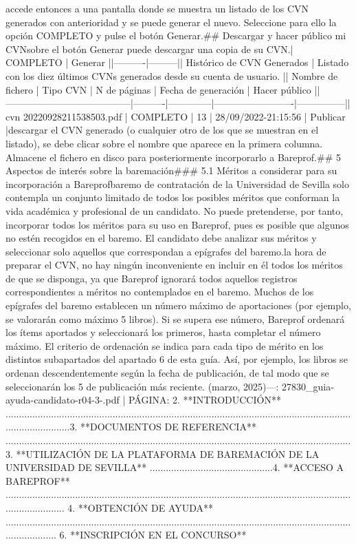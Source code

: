 \documentclass{article}
\begin{document}
\begin{itemize}
{{accede entonces a una pantalla donde se muestra un listado de los CVN generados con anterioridad y se puede generar el nuevo. Seleccione para ello la opción COMPLETO y pulse el botón Generar.\n\n## Descargar y hacer público mi CVN\n\nPulsando sobre el botón Generar puede descargar una copia de su CVN.\n\n| COMPLETO | Generar |\n|----------|---------|\n| Histórico de CVN Generados | Listado con los diez últimos CVNs generados desde su cuenta de usuario. |\n\n| Nombre de fichero                     | Tipo CVN | N de páginas | Fecha de generación     | Hacer público |\n|---------------------------------------|----------|--------------|-------------------------|---------------|\n| cvn 20220928211538503.pdf             | COMPLETO | 13           | 28/09/2022-21:15:56     | Publicar      |\n\nPara descargar el CVN generado (o cualquier otro de los que se muestran en el listado), se debe clicar sobre el nombre que aparece en la primera columna. Almacene el fichero en disco para posteriormente incorporarlo a Bareprof.\n\n## 5 Aspectos de interés sobre la baremación\n\n### 5.1 Méritos a considerar para su incorporación a Bareprof\n\nEl baremo de contratación de la Universidad de Sevilla solo contempla un conjunto limitado de todos los posibles méritos que conforman la vida académica y profesional de un candidato. No puede pretenderse, por tanto, incorporar todos los méritos para su uso en Bareprof, pues es posible que algunos no estén recogidos en el baremo. El candidato debe analizar sus méritos y seleccionar solo aquellos que correspondan a epígrafes del baremo.\n\nA la hora de preparar el CVN, no hay ningún inconveniente en incluir en él todos los méritos de que se disponga, ya que Bareprof ignorará todos aquellos registros correspondientes a méritos no contemplados en el baremo. Muchos de los epígrafes del baremo establecen un número máximo de aportaciones (por ejemplo, se valorarán como máximo 5 libros). Si se supera ese número, Bareprof ordenará los ítems aportados y seleccionará los primeros, hasta completar el número máximo. El criterio de ordenación se indica para cada tipo de mérito en los distintos subapartados del apartado 6 de esta guía. Así, por ejemplo, los libros se ordenan descendentemente según la fecha de publicación, de tal modo que se seleccionarán los 5 de publicación más reciente.\n{} (marzo, 2025)\n\n---\n\nFUENTE: 27830_guia-ayuda-candidato-r04-3-.pdf | PÁGINA: 2. **INTRODUCCIÓN** .........................................................................................................................................................3. **DOCUMENTOS DE REFERENCIA** .................................................................................................................................3. **UTILIZACIÓN DE LA PLATAFORMA DE BAREMACIÓN DE LA UNIVERSIDAD DE SEVILLA** ..............................................4. **ACCESO A BAREPROF** ....................................................................................................................................................... 4. **OBTENCIÓN DE AYUDA** .................................................................................................................................................... 6. **INSCRIPCIÓN EN EL CONCURSO** }}
\end{itemize}
\end{document}
